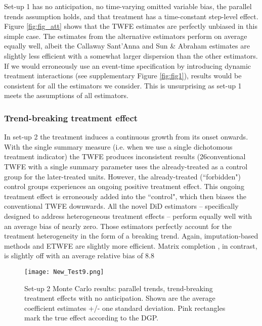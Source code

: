 Set-up 1 has no anticipation, no time-varying omitted variable bias, the parallel trends assumption holds, and that treatment has a time-constant step-level effect. Figure \ref{fig:fig_att} shows that the TWFE estimates are perfectly unbiased in this simple case. The estimates from the alternative estimators perform on average equally well, albeit the Callaway Sant'Anna and Sun \& Abraham estimates are slightly less efficient with a somewhat larger dispersion than the other estimators. If we would erroneously use an event-time specification by introducing dynamic treatment interactions (see supplementary Figure \ref{fig:fig1}), results would be consistent for all the estimators we consider. This is unsurprising as set-up 1 meets the assumptions of all estimators. 

\subsubsection{Trend-breaking treatment effect}

In set-up 2 the treatment induces a continuous growth from its onset onwards. With the single summary measure (i.e. when we use a single dichotomous treatment indicator) the TWFE produces inconsistent results (26\The conventional TWFE with a single summary parameter uses the already-treated as a control group for the later-treated units. However, the already-treated (``forbidden") control groups experiences an ongoing positive treatment effect. This ongoing treatment effect is erroneously added into the ``control", which then biases the conventional TWFE downwards. All the novel DiD estimators -- specifically designed to address heterogeneous treatment effects -- perform equally well with an average bias of nearly zero. Those estimators perfectly account for the treatment heterogeneity in the form of a breaking trend. Again, imputation-based methods \cite{Borusyak.2021} and ETWFE \cite{Wooldridge.2021} are slightly more efficient. Matrix completion \cite{Athey.2021}, in contrast, is slightly off with an average relative bias of 8.8\
\begin{figure}[t]    \texttt{[image: New\_Test9.png]} 
    \caption{Set-up 2 Monte Carlo results: parallel trends, trend-breaking treatment effects with no anticipation. Shown are the average coefficient estimates +/- one standard deviation. Pink rectangles mark the true effect according to the DGP.}    \label{fig:fig2}    \hypertarget{fig:fig2}{}\end{figure}



